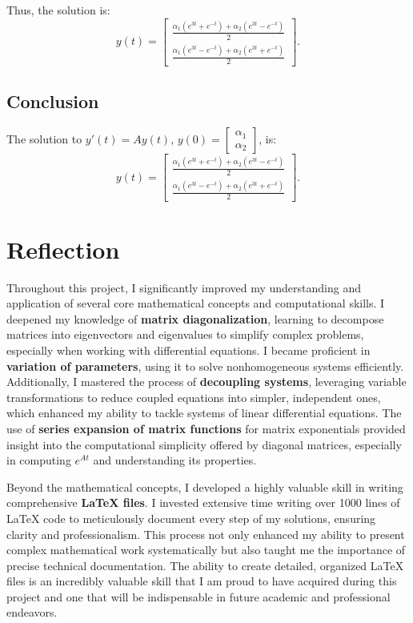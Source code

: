 \documentclass[12pt]{article}
\begin{document}
Thus, the solution is:
\[
y(t) = \begin{bmatrix} 
\frac{\alpha_1 (e^{3t} + e^{-t}) + \alpha_2 (e^{3t} - e^{-t})}{2} \\
\frac{\alpha_1 (e^{3t} - e^{-t}) + \alpha_2 (e^{3t} + e^{-t})}{2}
\end{bmatrix}.
\]

\subsection*{Conclusion}

The solution to \(y'(t) = Ay(t)\), \(y(0) = \begin{bmatrix} \alpha_1 \\ \alpha_2 \end{bmatrix}\), is:
\[
y(t) = \begin{bmatrix} 
\frac{\alpha_1 (e^{3t} + e^{-t}) + \alpha_2 (e^{3t} - e^{-t})}{2} \\
\frac{\alpha_1 (e^{3t} - e^{-t}) + \alpha_2 (e^{3t} + e^{-t})}{2}
\end{bmatrix}.
\]

\section*{Reflection}

Throughout this project, I significantly improved my understanding and application of several core mathematical concepts and computational skills. I deepened my knowledge of \textbf{matrix diagonalization}, learning to decompose matrices into eigenvectors and eigenvalues to simplify complex problems, especially when working with differential equations. I became proficient in \textbf{variation of parameters}, using it to solve nonhomogeneous systems efficiently. Additionally, I mastered the process of \textbf{decoupling systems}, leveraging variable transformations to reduce coupled equations into simpler, independent ones, which enhanced my ability to tackle systems of linear differential equations. The use of \textbf{series expansion of matrix functions} for matrix exponentials provided insight into the computational simplicity offered by diagonal matrices, especially in computing \(e^{At}\) and understanding its properties.

Beyond the mathematical concepts, I developed a highly valuable skill in writing comprehensive \textbf{LaTeX files}. I invested extensive time writing over 1000 lines of LaTeX code to meticulously document every step of my solutions, ensuring clarity and professionalism. This process not only enhanced my ability to present complex mathematical work systematically but also taught me the importance of precise technical documentation. The ability to create detailed, organized LaTeX files is an incredibly valuable skill that I am proud to have acquired during this project and one that will be indispensable in future academic and professional endeavors.
\end{document}
